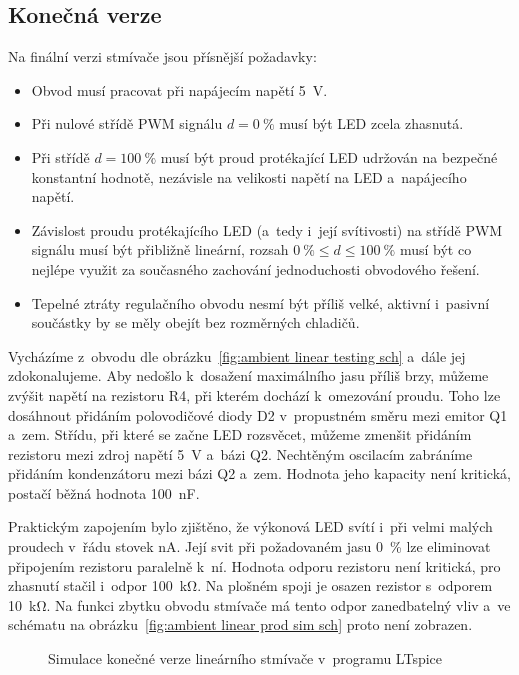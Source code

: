 \subsection{Konečná verze}
Na finální verzi stmívače jsou přísnější požadavky:
\begin{itemize}[nosep]
    \item Obvod musí pracovat při napájecím napětí \SI{5}{\volt}.
    \item Při nulové střídě PWM signálu $d = \SI{0}{\percent}$ musí být LED
        zcela zhasnutá.
    \item Při střídě $d = \SI{100}{\percent}$ musí být proud protékající LED
        udržován na bezpečné konstantní hodnotě, nezávisle na velikosti
        napětí na LED a~napájecího napětí.
    \item Závislost proudu protékajícího LED (a~tedy i~její svítivosti) na
        střídě PWM signálu musí být přibližně lineární, rozsah
        $\SI{0}{\percent} \le d \le \SI{100}{\percent}$ musí být co nejlépe
        využit za současného zachování jednoduchosti obvodového řešení.
    \item Tepelné ztráty regulačního obvodu nesmí být příliš velké, aktivní
        i~pasivní součástky by se měly obejít bez rozměrných chladičů.
\end{itemize}

Vycházíme z~obvodu dle obrázku~\vref{fig:ambient linear testing sch} a~dále jej
zdokonalujeme. Aby nedošlo k~dosažení maximálního jasu příliš brzy, můžeme
zvýšit napětí na rezistoru R4, při kterém dochází k~omezování proudu. Toho lze
dosáhnout přidáním polovodičové diody D2 v~propustném směru mezi emitor Q1
a~zem. Střídu, při které se začne LED rozsvěcet, můžeme zmenšit přidáním
rezistoru mezi zdroj napětí \SI{5}{\volt} a~bázi Q2. Nechtěným oscilacím
zabráníme přidáním kondenzátoru mezi bázi Q2 a~zem. Hodnota jeho kapacity není
kritická, postačí běžná hodnota \SI{100}{\nano\farad}.

Praktickým zapojením bylo zjištěno, že výkonová LED svítí i~při velmi malých
proudech v~řádu stovek \si{\nano\ampere}. Její svit při požadovaném jasu
\SI{0}{\percent} lze eliminovat připojením rezistoru paralelně k~ní. Hodnota
odporu rezistoru není kritická, pro zhasnutí stačil i~odpor
\SI{100}{\kilo\ohm}. Na plošném spoji je osazen rezistor s~odporem
\SI{10}{\kilo\ohm}. Na funkci zbytku obvodu stmívače má tento odpor
zanedbatelný vliv a~ve schématu na
obrázku~\vref{fig:ambient linear prod sim sch} proto není zobrazen.

\begin{figure}
    \centering
    \caption{Simulace konečné verze lineárního stmívače v~programu LTspice}
    \label{fig:ambient linear prod sim}
\end{figure}

